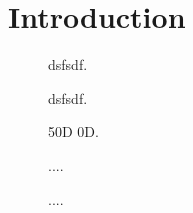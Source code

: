 \section{Introduction}
\lipsum[5]

\begin{figure}[h]
	\centering
    
	\caption{dsfsdf.}
	\label{fig:bat_discharge}
\end{figure}

\begin{figure}[h]
	\centering
    
	\caption{dsfsdf.}
	\label{fig:bat_discharge}
\end{figure}



\begin{figure}[h]
	\centering
    
	\caption{50D 0D.}
	\label{fig:controllerboardv2_}
\end{figure}

\begin{figure}[h]
	\centering
    
	\caption{....}
	\label{fig:controllerboardv2_}
\end{figure}


\begin{figure}[h]
	\centering
    
	\caption{....}
	\label{fig:controllerboardv2_}
\end{figure}
